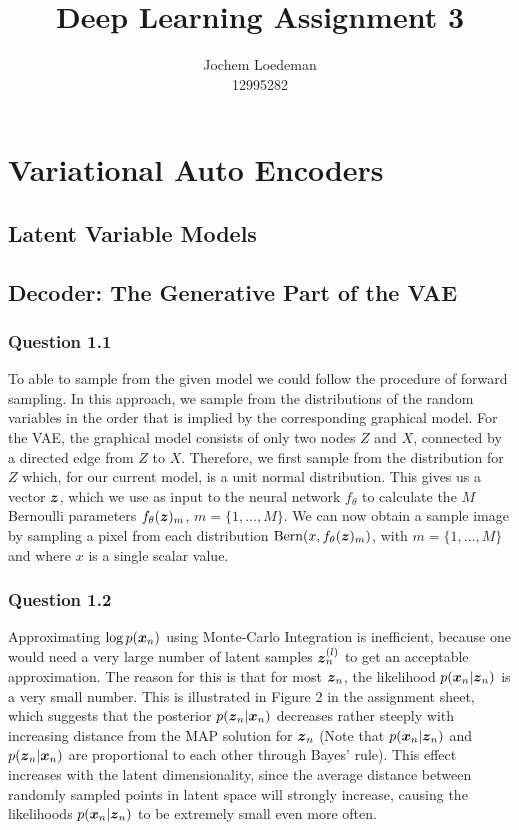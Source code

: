 \documentclass{article}
\title{Deep Learning Assignment 3}
\author{%
  Jochem Loedeman \\
  12995282
}
\begin{document}
\maketitle
\section{Variational Auto Encoders}
\subsection{Latent Variable Models}
\subsection{Decoder: The Generative Part of the VAE}
\subsubsection*{Question 1.1}
To able to sample from the given model we could follow the procedure of forward sampling. In this approach, we sample from the distributions of the random variables in the order that is implied by the corresponding graphical model. For the VAE, the graphical model consists of only two nodes $Z$ and $X$, connected by a directed edge from $Z$ to $X$. Therefore, we first sample from the distribution for $Z$ which, for our current model, is a unit normal distribution. This gives us a vector $\boldsymbol{z}$, which we use as input to the neural network $f_\theta$ to calculate the $M$ Bernoulli parameters $f_\theta(\boldsymbol{z})_m$, $m = \{1,\dots, M\}$. We can now obtain a sample image by sampling a pixel from each distribution $\text{Bern}(x, f_\theta(\boldsymbol{z})_m)$, with $m = \{1,\dots, M\}$ and where $x$ is a single scalar value.
\subsubsection*{Question 1.2}
Approximating $\log p(\boldsymbol{x}_n)$ using Monte-Carlo Integration is inefficient, because one would need a very large number of latent samples $\boldsymbol{z}_n^{(l)}$ to get an acceptable approximation. The reason for this is that for most $\boldsymbol{z}_n$, the likelihood $p(\boldsymbol{x}_n | \boldsymbol{z}_n)$ is a very small number. This is illustrated in Figure 2 in the assignment sheet, which suggests that the posterior $p(\boldsymbol{z}_n | \boldsymbol{x}_n)$ decreases rather steeply with increasing distance from the MAP solution for $\boldsymbol{z}_n$ (Note that $p(\boldsymbol{x}_n | \boldsymbol{z}_n)$ and $p(\boldsymbol{z}_n | \boldsymbol{x}_n)$ are proportional to each other through Bayes' rule). This effect increases with the latent dimensionality, since the average distance between randomly sampled points in latent space will strongly increase, causing the likelihoods $p(\boldsymbol{x}_n | \boldsymbol{z}_n)$ to be extremely small even more often.
\end{document}

